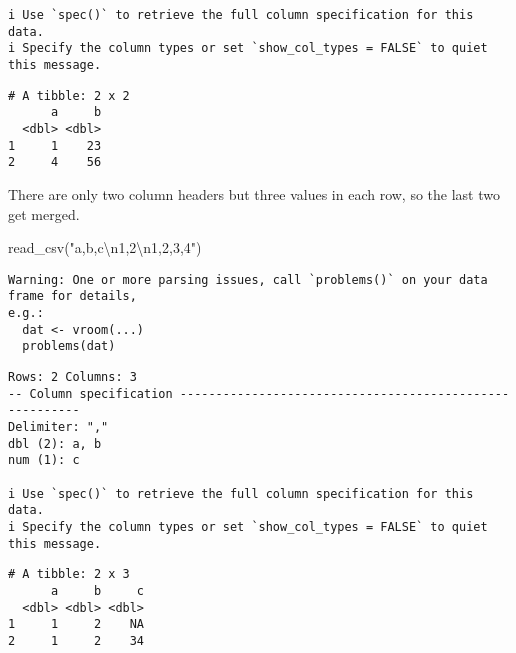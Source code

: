 \documentclass[
  letterpaper,
  DIV=11,
  numbers=noendperiod]{scrreprt}
\newenvironment{Shaded}{\begin{snugshade}}{\end{snugshade}}
\newcommand{\FunctionTok}[1]{\textcolor[rgb]{0.28,0.35,0.67}{#1}}
\newcommand{\NormalTok}[1]{\textcolor[rgb]{0.00,0.23,0.31}{#1}}
\newcommand{\SpecialCharTok}[1]{\textcolor[rgb]{0.37,0.37,0.37}{#1}}
\newcommand{\StringTok}[1]{\textcolor[rgb]{0.13,0.47,0.30}{#1}}
\begin{document}
\begin{enumerate}
\begin{tcolorbox}
\begin{verbatim}
i Use `spec()` to retrieve the full column specification for this data.
i Specify the column types or set `show_col_types = FALSE` to quiet this message.
\end{verbatim}

\begin{verbatim}
# A tibble: 2 x 2
      a     b
  <dbl> <dbl>
1     1    23
2     4    56
\end{verbatim}

  There are only two column headers but three values in each row, so the
  last two get merged.

  \end{tcolorbox}

  \begin{tcolorbox}[enhanced jigsaw, left=2mm, rightrule=.15mm, bottomtitle=1mm, opacitybacktitle=0.6, leftrule=.75mm, opacityback=0, colframe=quarto-callout-note-color-frame, bottomrule=.15mm, coltitle=black, toptitle=1mm, colback=white, titlerule=0mm, colbacktitle=quarto-callout-note-color!10!white, title={Answer}, toprule=.15mm, breakable, arc=.35mm]

\begin{Shaded}
\begin{Highlighting}[]
\FunctionTok{read\_csv}\NormalTok{(}\StringTok{"a,b,c}\SpecialCharTok{\textbackslash{}n}\StringTok{1,2}\SpecialCharTok{\textbackslash{}n}\StringTok{1,2,3,4"}\NormalTok{)}
\end{Highlighting}
\end{Shaded}

\begin{verbatim}
Warning: One or more parsing issues, call `problems()` on your data frame for details,
e.g.:
  dat <- vroom(...)
  problems(dat)
\end{verbatim}

\begin{verbatim}
Rows: 2 Columns: 3
-- Column specification --------------------------------------------------------
Delimiter: ","
dbl (2): a, b
num (1): c

i Use `spec()` to retrieve the full column specification for this data.
i Specify the column types or set `show_col_types = FALSE` to quiet this message.
\end{verbatim}

\begin{verbatim}
# A tibble: 2 x 3
      a     b     c
  <dbl> <dbl> <dbl>
1     1     2    NA
2     1     2    34
\end{verbatim}


\end{tcolorbox}
\end{enumerate}
\end{document}
